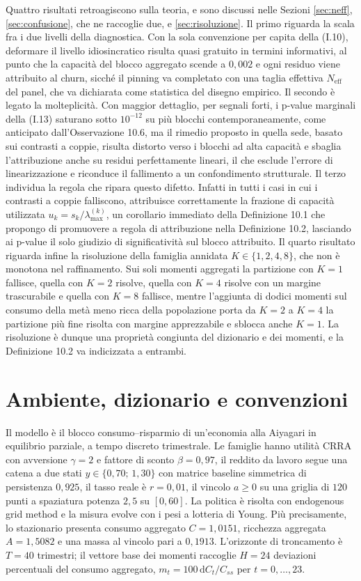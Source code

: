\documentclass[11pt,a4paper]{article}
\newcommand{\Neff}{N_{\mathrm{eff}}}
\newcommand{\dd}{\mathrm{d}}
\begin{document}
Quattro risultati retroagiscono sulla teoria, e sono discussi nelle Sezioni \ref{sec:neff}, \ref{sec:confusione}, che ne raccoglie due, e \ref{sec:risoluzione}. Il primo riguarda la scala fra i due livelli della diagnostica. Con la sola convenzione per capita della (I.10), deformare il livello idiosincratico risulta quasi gratuito in termini informativi, al punto che la capacit\`a del blocco aggregato scende a $0{,}002$ e ogni residuo viene attribuito al churn, sicch\'e il pinning va completato con una taglia effettiva $\Neff$ del panel, che va dichiarata come statistica del disegno empirico.
Il secondo è legato la molteplicit\`a. Con maggior dettaglio, per segnali forti, i p-value marginali della (I.13) saturano sotto $10^{-12}$ su pi\`u blocchi contemporaneamente, come anticipato dall'Osservazione 10.6, ma il rimedio proposto in quella sede, basato sui contrasti a coppie, risulta distorto verso i blocchi ad alta capacit\`a e sbaglia l'attribuzione anche su residui perfettamente lineari, il che esclude l'errore di linearizzazione e riconduce il fallimento a un confondimento strutturale.
Il terzo individua la regola che ripara questo difetto. Infatti in tutti i casi in cui i contrasti a coppie falliscono, attribuisce correttamente la frazione di capacit\`a utilizzata $u_k=s_k/\lambda_{\max}^{(k)}$, un corollario immediato della Definizione 10.1 che propongo di promuovere a regola di attribuzione nella Definizione 10.2, lasciando ai p-value il solo giudizio di significativit\`a sul blocco attribuito.
Il quarto risultato riguarda infine la risoluzione della famiglia annidata $K\in\{1,2,4,8\}$, che non \`e monotona nel raffinamento. Sui soli momenti aggregati la partizione con $K=1$ fallisce, quella con $K=2$ risolve, quella con $K=4$ risolve con un margine trascurabile e quella con $K=8$ fallisce, mentre l'aggiunta di dodici momenti sul consumo della met\`a meno ricca della popolazione porta da $K=2$ a $K=4$ la partizione pi\`u fine risolta con margine apprezzabile e sblocca anche $K=1$. La risoluzione \`e dunque una propriet\`a congiunta del dizionario e dei momenti, e la Definizione 10.2 va indicizzata a entrambi.

\section{Ambiente, dizionario e convenzioni}\label{sec:ambiente}
Il modello \`e il blocco consumo--risparmio di un'economia alla Aiyagari in equilibrio parziale, a tempo discreto trimestrale. Le famiglie hanno utilit\`a CRRA con avversione $\gamma=2$ e fattore di sconto $\beta=0{,}97$, il reddito da lavoro segue una catena a due stati $y\in\{0{,}70;\,1{,}30\}$ con matrice baseline simmetrica di persistenza $0{,}925$, il tasso reale \`e $r=0{,}01$, il vincolo $a\ge0$ su una griglia di $120$ punti a spaziatura potenza $2{,}5$ su $[0,60]$. La politica \`e risolta con endogenous grid method e la misura evolve con i pesi a lotteria di Young. Più precisamente, lo stazionario presenta consumo aggregato $C=1{,}0151$, ricchezza aggregata $A=1{,}5082$ e una massa al vincolo pari a $0{,}1913$. L'orizzonte di troncamento \`e $T=40$ trimestri; il vettore base dei momenti raccoglie $H=24$ deviazioni percentuali del consumo aggregato, $m_t=100\,\dd C_t/C_{ss}$ per $t=0,\dots,23$.
\end{document}
